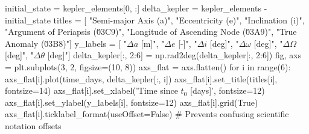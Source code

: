 {}
\markdownRendererSectionEnd \markdownRendererSectionBegin
{}\markdownRendererInterblockSeparator
{}
\markdownRendererSectionEnd \markdownRendererSectionBegin
{}\markdownRendererInterblockSeparator
{}initial_state = kepler_elements[0, :]\markdownRendererInterblockSeparator
{}
\markdownRendererSectionEnd \markdownRendererSectionBegin
{}\markdownRendererInterblockSeparator
{}delta_kepler = kepler_elements - initial_state\markdownRendererInterblockSeparator
{}
\markdownRendererSectionEnd \markdownRendererSectionBegin
{}\markdownRendererInterblockSeparator
{}
\markdownRendererSectionEnd \markdownRendererSectionBegin
{}\markdownRendererInterblockSeparator
{}titles = [ "Semi-major Axis (a)", "Eccentricity (e)", "Inclination (i)", "Argument of Periapsis (\u03C9)", "Longitude of Ascending Node (\u03A9)", "True Anomaly (\u03B8)"] y_labels = [ "$\Delta a$ [m]", "$\Delta e$ [-]", "$\Delta i$ [deg]", "$\Delta \omega$ [deg]", "$\Delta \Omega$ [deg]", "$\Delta \theta$ [deg]"]\markdownRendererInterblockSeparator
{}
\markdownRendererSectionEnd \markdownRendererSectionBegin
{}\markdownRendererInterblockSeparator
{}delta_kepler[:, 2:6] = np.rad2deg(delta_kepler[:, 2:6])\markdownRendererInterblockSeparator
{}
\markdownRendererSectionEnd \markdownRendererSectionBegin
{}\markdownRendererInterblockSeparator
{}fig, axs = plt.subplots(3, 2, figsize=(10, 8))\markdownRendererInterblockSeparator
{}
\markdownRendererSectionEnd \markdownRendererSectionBegin
{}\markdownRendererInterblockSeparator
{}
\markdownRendererSectionEnd \markdownRendererSectionBegin
{}\markdownRendererInterblockSeparator
{}axs_flat = axs.flatten() for i in range(6): axs_flat[i].plot(time_days, delta_kepler[:, i]) axs_flat[i].set_title(titles[i], fontsize=14) axs_flat[i].set_xlabel('Time since $t_0$ [days]', fontsize=12) axs_flat[i].set_ylabel(y_labels[i], fontsize=12) axs_flat[i].grid(True) axs_flat[i].ticklabel_format(useOffset=False) # Prevents confusing scientific notation offsets\markdownRendererInterblockSeparator
